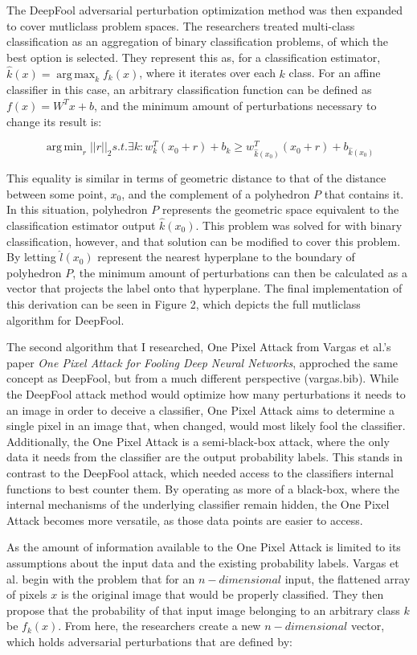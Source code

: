 \documentclass[../article.tex]{subfiles}
\DeclareMathOperator*{\argmin}{arg\,min}
\DeclareMathOperator*{\argmax}{arg\,max}
\begin{document}
The DeepFool adversarial perturbation optimization method was then expanded to cover mutliclass problem spaces. The researchers treated multi-class classification as an aggregation of binary classification problems, of which the best option is selected. They represent this as, for a classification estimator, $\hat{k}(x) = \argmax_{k} f_k(x)$, where it iterates over each $k$ class. For an affine classifier in this case, an arbitrary classification function can be defined as $f(x) = W^Tx + b$, and the minimum amount of perturbations necessary to change its result is:

\[\argmin_{r} ||r||_2 s.t. \exists k: w_k^T(x_0 + r) + b_k \geq w_{\hat{k}(x_0)}^T (x_0+r) + b_{\hat{k}(x_0)}\] 

This equality is similar in terms of geometric distance to that of the distance between some point, $x_0$, and the complement of a polyhedron $P$ that contains it. In this situation, polyhedron $P$ represents the geometric space equivalent to the classification estimator output $\hat{k}(x_0)$. This problem was solved for with binary classification, however, and that solution can be modified to cover this problem. By letting $\hat{l}(x_0)$ represent the nearest hyperplane to the boundary of polyhedron $P$, the minimum amount of perturbations can then be calculated as a vector that projects the label onto that hyperplane. The final implementation of this derivation can be seen in Figure 2, which depicts the full mutliclass algorithm for DeepFool.

The second algorithm that I researched, One Pixel Attack from Vargas et al.'s paper \emph{One Pixel Attack for Fooling Deep Neural Networks}, approched the same concept as DeepFool, but from a much different perspective (vargas.bib). While the DeepFool attack method would optimize how many perturbations it needs to an image in order to deceive a classifier, One Pixel Attack aims to determine a single pixel in an image that, when changed, would most likely fool the classifier. Additionally, the One Pixel Attack is a semi-black-box attack, where the only data it needs from the classifier are the output probability labels. This stands in contrast to the DeepFool attack, which needed access to the classifiers internal functions to best counter them. By operating as more of a black-box, where the internal mechanisms of the underlying classifier remain hidden, the One Pixel Attack becomes more versatile, as those data points are easier to access.

As the amount of information available to the One Pixel Attack is limited to its assumptions about the input data and the existing probability labels. Vargas et al. begin with the problem that for an $n-dimensional$ input, the flattened array of pixels $x$ is the original image that would be properly classified. They then propose that the probability of that input image belonging to an arbitrary class $k$ be $f_k(x)$. From here, the researchers create a new $n-dimensional$ vector, which holds adversarial perturbations that are defined by:
\end{document}
